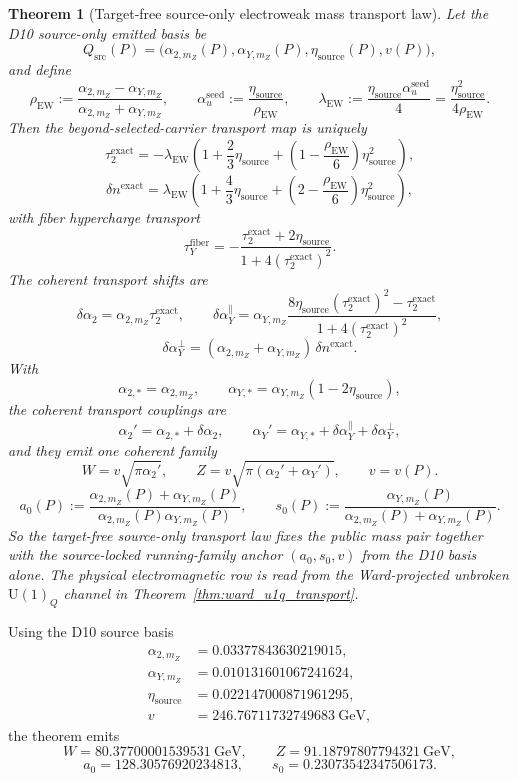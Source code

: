 \documentclass[11pt]{article}
\newtheorem{theorem}{Theorem}[section]
\newcommand{\U}{\mathrm{U}}
\begin{document}
\begin{theorem}[Target-free source-only electroweak mass transport law]
Let the D10 source-only emitted basis be
\[
Q_{\mathrm{src}}(P)=
\bigl(\alpha_{2,m_Z}(P),\alpha_{Y,m_Z}(P),\eta_{\mathrm{source}}(P),v(P)\bigr),
\]
and define
\[
\rho_{\mathrm{EW}}
:=
\frac{\alpha_{2,m_Z}-\alpha_{Y,m_Z}}{\alpha_{2,m_Z}+\alpha_{Y,m_Z}},
\qquad
\alpha_u^{\mathrm{seed}}
:=
\frac{\eta_{\mathrm{source}}}{\rho_{\mathrm{EW}}},
\qquad
\lambda_{\mathrm{EW}}
:=
\frac{\eta_{\mathrm{source}}\alpha_u^{\mathrm{seed}}}{4}
=
\frac{\eta_{\mathrm{source}}^2}{4\rho_{\mathrm{EW}}}.
\]
Then the beyond-selected-carrier transport map is uniquely
\[
\tau_2^{\mathrm{exact}}
=
-\lambda_{\mathrm{EW}}
\left(
1+\frac23\eta_{\mathrm{source}}
+
\left(1-\frac{\rho_{\mathrm{EW}}}{6}\right)\eta_{\mathrm{source}}^2
\right),
\]
\[
\delta n^{\mathrm{exact}}
=
\lambda_{\mathrm{EW}}
\left(
1+\frac43\eta_{\mathrm{source}}
+
\left(2-\frac{\rho_{\mathrm{EW}}}{6}\right)\eta_{\mathrm{source}}^2
\right),
\]
with fiber hypercharge transport
\[
\tau_Y^{\mathrm{fiber}}
=
-\frac{\tau_2^{\mathrm{exact}}+2\eta_{\mathrm{source}}}
{1+4(\tau_2^{\mathrm{exact}})^2}.
\]
The coherent transport shifts are
\[
\delta\alpha_2=\alpha_{2,m_Z}\tau_2^{\mathrm{exact}},
\qquad
\delta\alpha_Y^{\parallel}
=
\alpha_{Y,m_Z}
\frac{8\eta_{\mathrm{source}}(\tau_2^{\mathrm{exact}})^2-\tau_2^{\mathrm{exact}}}
{1+4(\tau_2^{\mathrm{exact}})^2},
\]
\[
\delta\alpha_Y^{\perp}
=
(\alpha_{2,m_Z}+\alpha_{Y,m_Z})\,\delta n^{\mathrm{exact}}.
\]
With
\[
\alpha_{2,*}=\alpha_{2,m_Z},
\qquad
\alpha_{Y,*}=\alpha_{Y,m_Z}(1-2\eta_{\mathrm{source}}),
\]
the coherent transport couplings are
\[
\alpha_2'=\alpha_{2,*}+\delta\alpha_2,
\qquad
\alpha_Y'=\alpha_{Y,*}+\delta\alpha_Y^{\parallel}+\delta\alpha_Y^{\perp},
\]
and they emit one coherent family
\[
W=v\sqrt{\pi\alpha_2'},
\qquad
Z=v\sqrt{\pi(\alpha_2'+\alpha_Y')},
\qquad
v=v(P).
\]
\[
a_0(P)
:=
\frac{\alpha_{2,m_Z}(P)+\alpha_{Y,m_Z}(P)}
{\alpha_{2,m_Z}(P)\alpha_{Y,m_Z}(P)},
\qquad
s_0(P)
:=
\frac{\alpha_{Y,m_Z}(P)}
{\alpha_{2,m_Z}(P)+\alpha_{Y,m_Z}(P)}.
\]
So the target-free source-only transport law fixes the public mass pair together with the source-locked
running-family anchor \((a_0,s_0,v)\) from the D10 basis alone. The physical electromagnetic row
is read from the Ward-projected unbroken \(\U(1)_Q\) channel in
Theorem~\ref{thm:ward_u1q_transport}.
\end{theorem}

Using the D10 source basis
\[
\begin{aligned}
\alpha_{2,m_Z}&=0.03377843630219015,\\
\alpha_{Y,m_Z}&=0.010131601067241624,\\
\eta_{\mathrm{source}}&=0.022147000871961295,\\
v&=246.76711732749683~\mathrm{GeV},
\end{aligned}
\]
the theorem emits
\[
W=80.37700001539531~\mathrm{GeV},
\qquad
Z=91.18797807794321~\mathrm{GeV},
\]
\[
a_0=128.30576920234813,
\qquad
s_0=0.23073542347506173.
\]
\end{document}
